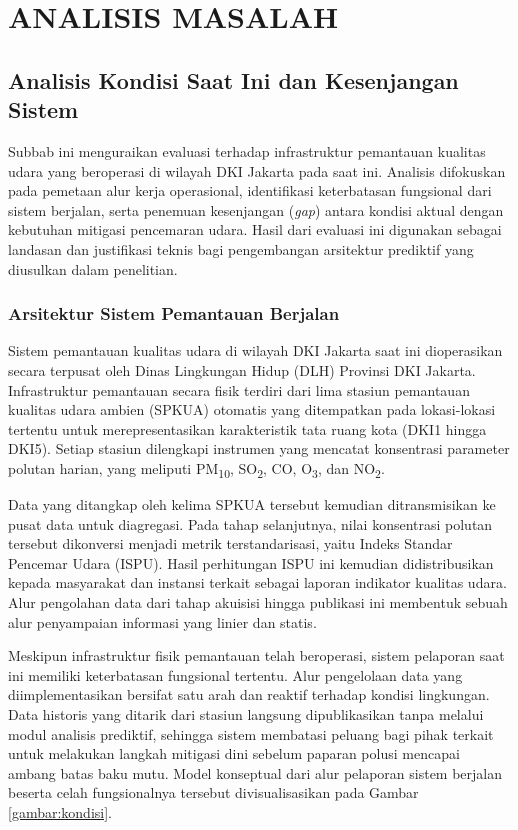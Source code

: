 \cleardoublepage
\chapter{ANALISIS MASALAH}
\label{chap:analisis-masalah}

\section{Analisis Kondisi Saat Ini dan Kesenjangan Sistem}

Subbab ini menguraikan evaluasi terhadap infrastruktur pemantauan kualitas udara yang beroperasi di wilayah DKI Jakarta pada saat ini. Analisis difokuskan pada pemetaan alur kerja operasional, identifikasi keterbatasan fungsional dari sistem berjalan, serta penemuan kesenjangan (\textit{gap}) antara kondisi aktual dengan kebutuhan mitigasi pencemaran udara. Hasil dari evaluasi ini digunakan sebagai landasan dan justifikasi teknis bagi pengembangan arsitektur prediktif yang diusulkan dalam penelitian.

\subsection{Arsitektur Sistem Pemantauan Berjalan}

Sistem pemantauan kualitas udara di wilayah DKI Jakarta saat ini dioperasikan secara terpusat oleh Dinas Lingkungan Hidup (DLH) Provinsi DKI Jakarta. Infrastruktur pemantauan secara fisik terdiri dari lima stasiun pemantauan kualitas udara ambien (SPKUA) otomatis yang ditempatkan pada lokasi-lokasi tertentu untuk merepresentasikan karakteristik tata ruang kota (DKI1 hingga DKI5). Setiap stasiun dilengkapi instrumen yang mencatat konsentrasi parameter polutan harian, yang meliputi PM\textsubscript{10}, SO\textsubscript{2}, CO, O\textsubscript{3}, dan NO\textsubscript{2}.

Data yang ditangkap oleh kelima SPKUA tersebut kemudian ditransmisikan ke pusat data untuk diagregasi. Pada tahap selanjutnya, nilai konsentrasi polutan tersebut dikonversi menjadi metrik terstandarisasi, yaitu Indeks Standar Pencemar Udara (ISPU). Hasil perhitungan ISPU ini kemudian didistribusikan kepada masyarakat dan instansi terkait sebagai laporan indikator kualitas udara. Alur pengolahan data dari tahap akuisisi hingga publikasi ini membentuk sebuah alur penyampaian informasi yang linier dan statis.

Meskipun infrastruktur fisik pemantauan telah beroperasi, sistem pelaporan saat ini memiliki keterbatasan fungsional tertentu. Alur pengelolaan data yang diimplementasikan bersifat satu arah dan reaktif terhadap kondisi lingkungan. Data historis yang ditarik dari stasiun langsung dipublikasikan tanpa melalui modul analisis prediktif, sehingga sistem membatasi peluang bagi pihak terkait untuk melakukan langkah mitigasi dini sebelum paparan polusi mencapai ambang batas baku mutu. Model konseptual dari alur pelaporan sistem berjalan beserta celah fungsionalnya tersebut divisualisasikan pada Gambar \ref{gambar:kondisi}.

